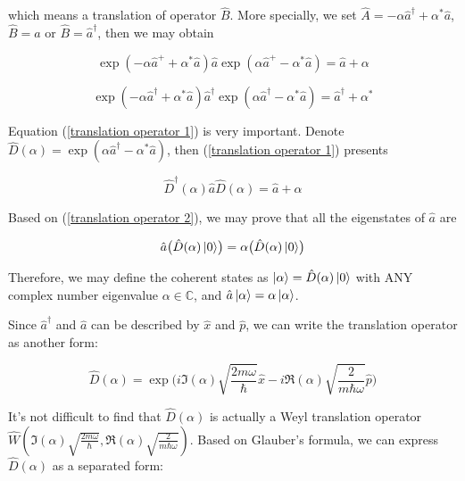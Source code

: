 \documentclass{article}
\begin{document}
        which means a translation of operator $\hat{B}$. More specially, we set $\hat{A}=-\alpha\hat{a}^\dagger+\alpha^*\hat{a}$, $\hat{B}=\hat{a}$ or $\hat{B}=\hat{a}^\dagger$, then we may obtain 

        \begin{equation}\label{translation operator 1}
            \exp(-\alpha\hat{a}^++\alpha^*\hat{a})\hat{a}\exp(\alpha\hat{a}^+-\alpha^*\hat{a}) = \hat{a}+\alpha
        \end{equation}

        \begin{equation}
            \exp(-\alpha\hat{a}^\dagger+\alpha^*\hat{a})\hat{a}^\dagger\exp(\alpha\hat{a}^\dagger-\alpha^*\hat{a}) = \hat{a}^\dagger+\alpha^*
        \end{equation}

        Equation (\ref{translation operator 1}) is very important. Denote $\hat{D}(\alpha)=\exp(\alpha\hat{a}^\dagger -\alpha^*\hat{a})$, then (\ref{translation operator 1}) presents

        \begin{equation}\label{translation operator 2}
            \hat{D}^\dagger(\alpha)\hat{a}\hat{D}(\alpha) = \hat{a} + \alpha
        \end{equation}

        Based on (\ref{translation operator 2}), we may prove that all the eigenstates of $\hat{a}$ are 

        \begin{equation}
            \hat{a} \bigl(\hat{D}(\alpha)\ket{0}\bigr) = \alpha \bigl(\hat{D}(\alpha)\ket{0}\bigr)
        \end{equation}

        Therefore, we may define the coherent states as $\ket{\alpha} = \hat{D}(\alpha)\ket{0}$ with ANY complex number eigenvalue $\alpha\in\mathbb{C}$, and $\hat{a}\ket{\alpha}=\alpha\ket{\alpha}$.

        Since $\hat{a}^\dagger$ and $\hat{a}$ can be described by $\hat{x}$ and $\hat{p}$, we can write the translation operator as another form: 

        \begin{equation}\label{Weyl translation 1}
            \hat{D}(\alpha) = \exp\biggl(i\Im(\alpha)\sqrt{\frac{2m\omega}{\hbar}}\hat{x}-i\Re(\alpha)\sqrt{\frac{2}{m\hbar\omega}}\hat{p}\biggr)
        \end{equation}

        It's not difficult to find that $\hat{D}(\alpha)$ is actually a Weyl translation operator $\hat{W}(\Im(\alpha)\sqrt{\frac{2m\omega}{\hbar}}, \Re(\alpha)\sqrt{\frac{2}{m\hbar\omega}})$. Based on Glauber's formula, we can express $\hat{D}(\alpha)$ as a separated form:
\end{document}
